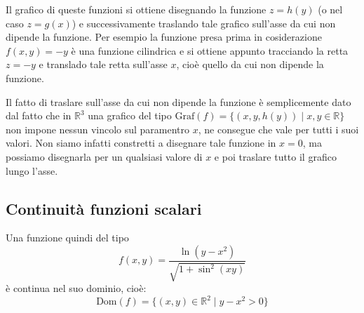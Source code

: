 Il grafico di queste funzioni si ottiene disegnando la funzione $z = h(y)$ (o nel caso $z = g(x)$) e successivamente traslando tale grafico sull'asse da cui non dipende la funzione. Per esempio la funzione presa prima in cosiderazione $f(x, y) = -y$ è una funzione cilindrica e si ottiene appunto tracciando la retta $z = -y$ e translado tale retta sull'asse $x$, cioè quello da cui non dipende la funzione. %

Il fatto di traslare sull'asse da cui non dipende la funzione è semplicemente dato dal fatto che in $\mathbb{R}^3$ una grafico del tipo $\text{Graf}(f) = \{(x, y, h(y)) \;|\; x, y \in \mathbb{R}\}$ non impone nessun vincolo sul paramentro $x$, ne consegue che vale per tutti i suoi valori. Non siamo infatti constretti a disegnare tale funzione in $x = 0$, ma possiamo disegnarla per un qualsiasi valore di $x$ e poi traslare tutto il grafico lungo l'asse.

\subsection{Continuità funzioni scalari}
Una funzione quindi del tipo
\begin{equation*}
	f(x, y) = \dfrac{\ln(y -x^2)}{\sqrt{1+\sin^2(xy)}}
\end{equation*}
è continua nel suo dominio, cioè:
\begin{equation*}
	\text{Dom}(f) = \{(x, y) \in \mathbb{R}^2 \;|\; y - x^2 > 0\}
\end{equation*}

